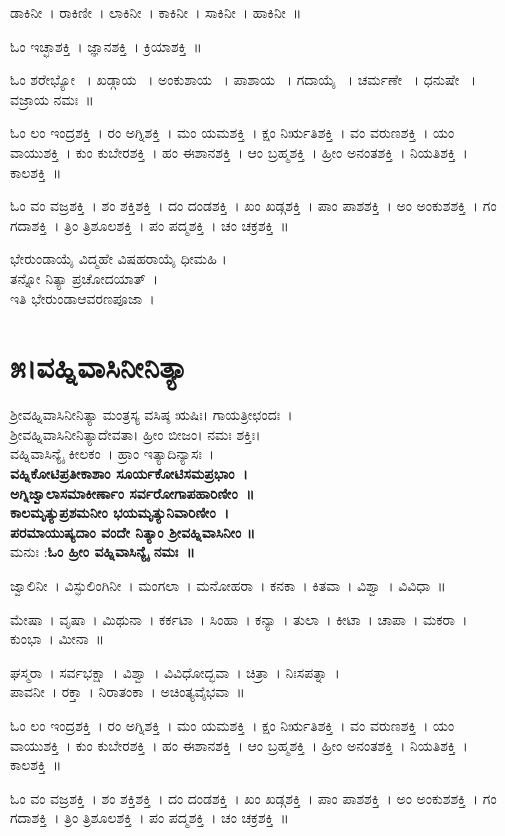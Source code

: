 ಡಾಕಿನೀ~।  ರಾಕಿಣೀ~।  ಲಾಕಿನೀ~।  ಕಾಕಿನೀ~।  ಸಾಕಿನೀ~।  ಹಾಕಿನೀ~॥ 

ಓಂ ಇಚ್ಛಾಶಕ್ತಿ~।  ಜ್ಞಾನಶಕ್ತಿ~।  ಕ್ರಿಯಾಶಕ್ತಿ~॥ 

ಓಂ ಶರೇಭ್ಯೋ ~।  ಖಡ್ಗಾಯ ~।  ಅಂಕುಶಾಯ ~। ಪಾಶಾಯ ~।  ಗದಾಯೈ ~। ಚರ್ಮಣೇ ~।  ಧನುಷೇ ~।  ವಜ್ರಾಯ  ನಮಃ~॥

ಓಂ ಲಂ ಇಂದ್ರಶಕ್ತಿ~।  ರಂ ಅಗ್ನಿಶಕ್ತಿ~।  ಮಂ ಯಮಶಕ್ತಿ~।  ಕ್ಷಂ ನಿರ್ಋತಿಶಕ್ತಿ~।  ವಂ ವರುಣಶಕ್ತಿ~।  ಯಂ ವಾಯುಶಕ್ತಿ~।  ಕುಂ ಕುಬೇರಶಕ್ತಿ~।  ಹಂ ಈಶಾನಶಕ್ತಿ~।  ಆಂ ಬ್ರಹ್ಮಶಕ್ತಿ~।  ಹ್ರೀಂ ಅನಂತಶಕ್ತಿ~।  ನಿಯತಿಶಕ್ತಿ~।  ಕಾಲಶಕ್ತಿ~॥ 

ಓಂ ವಂ ವಜ್ರಶಕ್ತಿ~।  ಶಂ ಶಕ್ತಿಶಕ್ತಿ~।  ದಂ ದಂಡಶಕ್ತಿ~।  ಖಂ ಖಡ್ಗಶಕ್ತಿ~।  ಪಾಂ ಪಾಶಶಕ್ತಿ~।  ಅಂ ಅಂಕುಶಶಕ್ತಿ~।  ಗಂ ಗದಾಶಕ್ತಿ~।  ತ್ರಿಂ ತ್ರಿಶೂಲಶಕ್ತಿ~।  ಪಂ ಪದ್ಮಶಕ್ತಿ~।  ಚಂ ಚಕ್ರಶಕ್ತಿ~॥ 

ಭೇರುಂಡಾಯೈ ವಿದ್ಮಹೇ ವಿಷಹರಾಯೈ ಧೀಮಹಿ ।\\ತನ್ನೋ ನಿತ್ಯಾ ಪ್ರಚೋದಯಾತ್~।\\
ಇತಿ ಭೇರುಂಡಾಆವರಣಪೂಜಾ~।
\section{೫।ವಹ್ನಿವಾಸಿನೀನಿತ್ಯಾ}
ಶ್ರೀವಹ್ನಿವಾಸಿನೀನಿತ್ಯಾ ಮಂತ್ರಸ್ಯ ವಸಿಷ್ಠ ಋಷಿಃ। ಗಾಯತ್ರೀಛಂದಃ~।\\ ಶ್ರೀವಹ್ನಿವಾಸಿನೀನಿತ್ಯಾದೇವತಾ। ಹ್ರೀಂ ಬೀಜಂ। ನಮಃ ಶಕ್ತಿಃ।\\ ವಹ್ನಿವಾಸಿನ್ಯೈ ಕೀಲಕಂ~। ಹ್ರಾಂ ಇತ್ಯಾದಿನ್ಯಾಸಃ~।\\
{\bfseries ವಹ್ನಿಕೋಟಿಪ್ರತೀಕಾಶಾಂ ಸೂರ್ಯಕೋಟಿಸಮಪ್ರಭಾಂ~।\\
ಅಗ್ನಿಜ್ವಾಲಾಸಮಾಕೀರ್ಣಾಂ ಸರ್ವರೋಗಾಪಹಾರಿಣೀಂ~॥\\
ಕಾಲಮೃತ್ಯುಪ್ರಶಮನೀಂ ಭಯಮೃತ್ಯುನಿವಾರಿಣೀಂ~।\\
ಪರಮಾಯುಷ್ಯದಾಂ ವಂದೇ ನಿತ್ಯಾಂ ಶ್ರೀವಹ್ನಿವಾಸಿನೀಂ ॥\\}
ಮನುಃ :{\bfseries ಓಂ ಹ್ರೀಂ ವಹ್ನಿವಾಸಿನ್ಯೈ ನಮಃ~॥}

ಜ್ವಾಲಿನೀ~। ವಿಸ್ಫುಲಿಂಗಿನೀ~। ಮಂಗಲಾ~। ಮನೋಹರಾ~। ಕನಕಾ~। ಕಿತವಾ~। ವಿಶ್ವಾ~। ವಿವಿಧಾ~॥

ಮೇಷಾ~। ವೃಷಾ~। ಮಿಥುನಾ~। ಕರ್ಕಟಾ~। ಸಿಂಹಾ~। ಕನ್ಯಾ~। ತುಲಾ~। ಕೀಟಾ~। ಚಾಪಾ~। ಮಕರಾ~। ಕುಂಭಾ~। ಮೀನಾ~॥ 

ಘಸ್ಮರಾ~। ಸರ್ವಭಕ್ಷಾ~। ವಿಶ್ವಾ~। ವಿವಿಧೋದ್ಭವಾ~। ಚಿತ್ರಾ~। ನಿಃಸಪತ್ನಾ~।\\ ಪಾವನೀ~। ರಕ್ತಾ~। ನಿರಾತಂಕಾ~। ಅಚಿಂತ್ಯವೈಭವಾ~॥

ಓಂ ಲಂ ಇಂದ್ರಶಕ್ತಿ~।  ರಂ ಅಗ್ನಿಶಕ್ತಿ~।  ಮಂ ಯಮಶಕ್ತಿ~।  ಕ್ಷಂ ನಿರ್ಋತಿಶಕ್ತಿ~।  ವಂ ವರುಣಶಕ್ತಿ~।  ಯಂ ವಾಯುಶಕ್ತಿ~।  ಕುಂ ಕುಬೇರಶಕ್ತಿ~।  ಹಂ ಈಶಾನಶಕ್ತಿ~।  ಆಂ ಬ್ರಹ್ಮಶಕ್ತಿ~।  ಹ್ರೀಂ ಅನಂತಶಕ್ತಿ~।  ನಿಯತಿಶಕ್ತಿ~।  ಕಾಲಶಕ್ತಿ~॥ 

ಓಂ ವಂ ವಜ್ರಶಕ್ತಿ~।  ಶಂ ಶಕ್ತಿಶಕ್ತಿ~।  ದಂ ದಂಡಶಕ್ತಿ~।  ಖಂ ಖಡ್ಗಶಕ್ತಿ~।  ಪಾಂ ಪಾಶಶಕ್ತಿ~।  ಅಂ ಅಂಕುಶಶಕ್ತಿ~।  ಗಂ ಗದಾಶಕ್ತಿ~।  ತ್ರಿಂ ತ್ರಿಶೂಲಶಕ್ತಿ~।  ಪಂ ಪದ್ಮಶಕ್ತಿ~।  ಚಂ ಚಕ್ರಶಕ್ತಿ~॥ 

